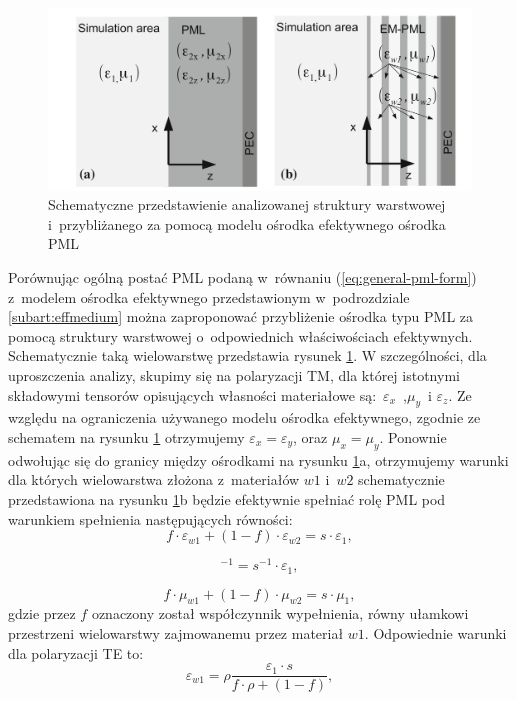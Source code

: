 \begin{figure}[tb]
	\includegraphics[width=\textwidth]{images/pml/oqe_schemat.png}
	\caption{Schematyczne przedstawienie analizowanej struktury warstwowej i~przybliżanego za pomocą modelu ośrodka efektywnego ośrodka PML}
	\label{fig:pml-multilay-schem}
\end{figure}

Porównując ogólną postać PML podaną w~równaniu (\ref{eq:general-pml-form}) z~modelem ośrodka efektywnego przedstawionym w~podrozdziale \ref{subart:effmedium} można zaproponować przybliżenie ośrodka typu PML za pomocą struktury warstwowej o~odpowiednich właściwościach efektywnych. Schematycznie taką wielowarstwę przedstawia rysunek \ref{fig:pml-multilay-schem}. W szczególności, dla uproszczenia analizy, skupimy się na polaryzacji TM, dla której istotnymi składowymi tensorów opisujących własności materiałowe są:~$\varepsilon_x$~,$\mu_y$~i $\varepsilon_z$. Ze względu na ograniczenia używanego modelu ośrodka efektywnego, zgodnie ze schematem na rysunku \ref{fig:pml-multilay-schem} otrzymujemy $\varepsilon_x=\varepsilon_y$, oraz $\mu_x=\mu_y$. Ponownie odwołując się do granicy między ośrodkami na rysunku \ref{fig:pml-multilay-schem}a, otrzymujemy warunki dla których wielowarstwa złożona z~materiałów $w1$ i~$w2$ schematycznie przedstawiona na rysunku \ref{fig:pml-multilay-schem}b będzie efektywnie spełniać rolę PML pod warunkiem spełnienia następujących równości:
\begin{equation}
	f\cdot \varepsilon_{w1} + (1-f)\cdot \varepsilon_{w2} = s \cdot \varepsilon_1,
	\label{eq:oqe4}
\end{equation}

\begin{equation}
	[f\cdot \varepsilon_{w1}^{-1}+(1-f)\varepsilon_{w2}^{-1}]^{-1}=s^{-1}\cdot \varepsilon_1,
	\label{eq:oqe5}
\end{equation}

\begin{equation}
	f\cdot \mu_{w1} + (1-f)\cdot \mu_{w2} = s \cdot \mu_1,
	\label{eq:oqe6}
\end{equation}
gdzie przez $f$ oznaczony został współczynnik wypełnienia, równy ułamkowi przestrzeni wielowarstwy zajmowanemu przez materiał $w1$. Odpowiednie warunki dla polaryzacji TE to:
\begin{equation}
	\varepsilon_{w1}=\rho \frac{\varepsilon_1 \cdot s}{f\cdot \rho + (1 -f) },
	\label{eq:te-eps1}
\end{equation}

